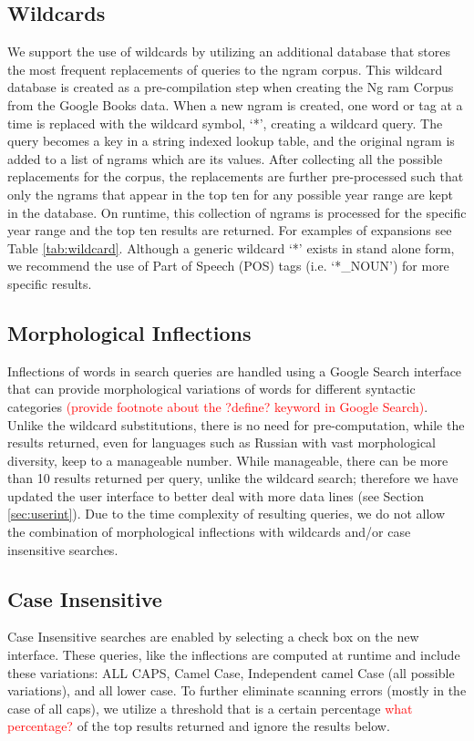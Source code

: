 \documentclass[11pt]{article}
\begin{document}
\subsection{Wildcards}
We support the use of wildcards by utilizing an additional database that stores the most frequent replacements of queries to the ngram corpus. This wildcard database is created as a pre-compilation step when creating the Ng ram Corpus from the Google Books data. When a new ngram is created, one word or tag at a time is replaced with the wildcard symbol, `*', creating a wildcard query. The query becomes a key in a string indexed lookup table, and the original ngram is added to a list of ngrams which are its values. After collecting all the possible replacements for the corpus, the replacements are further pre-processed such that only the ngrams that appear in the top ten for any possible year range are kept in the database. On runtime, this collection of ngrams is processed for the specific year range and the top ten results are returned. For examples of expansions see Table \ref{tab:wildcard}. Although a generic wildcard `*' exists in stand alone form, we recommend the use of Part of Speech (POS) tags (i.e. `*\_NOUN') for more specific results.

\subsection{Morphological Inflections}
Inflections of words in search queries are handled using a Google Search interface that can provide morphological variations of words for different syntactic categories \textcolor{red}{(provide footnote about the ?define? keyword in Google Search)}. Unlike the wildcard substitutions, there is no need for pre-computation, while the results returned, even for languages such as Russian with vast morphological diversity, keep to a manageable number. While manageable, there can be more than 10 results returned per query, unlike the wildcard search; therefore we have updated the user interface to better deal with more data lines (see Section \ref{sec:userint}). Due to the time complexity of resulting queries, we do not allow the combination of morphological inflections with wildcards and/or case insensitive searches.

\subsection{Case Insensitive}
Case Insensitive searches are enabled by selecting a check box on the new interface. These queries, like the inflections are computed at runtime and include these variations: ALL CAPS, Camel Case, Independent camel Case (all possible variations), and all lower case. To further eliminate scanning errors (mostly in the case of all caps), we utilize a threshold that is a certain percentage \textcolor{red}{what percentage?}
of the top results returned and ignore the results below.
\end{document}
